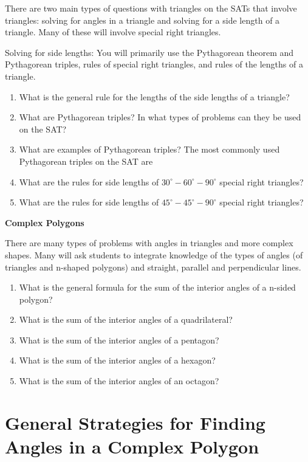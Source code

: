 \documentclass[12pt]{book}
\newcommand{\longline}{\underline{\hspace{2in}} }
\begin{document}
\hrulefill

There are two main types of questions with triangles on the SATs that involve triangles: solving for angles in a triangle and solving for a side length of a triangle. Many of these will involve special right triangles.

\bigskip
Solving for side lengths: You will primarily use the Pythagorean theorem and Pythagorean triples, rules of special right triangles, and rules of the lengths of a triangle. 

\bigskip
\begin{enumerate}[label=\arabic*)]
\item What is the general rule for the lengths of the side lengths of a triangle?
\vfill\item What are Pythagorean triples? In what types of problems can they be used on the SAT?
\vfill\item What are examples of Pythagorean triples? The most commonly used Pythagorean triples on the SAT are \longline
\vfill\item What are the rules for side lengths of $30^\circ-60^\circ-90^\circ$ special right triangles?
\vfill\item What are the rules for side lengths of $45^\circ-45^\circ-90^\circ$ special right triangles?
\end{enumerate}

\vfill
\newpage
\textbf{\large Complex Polygons}

There are many types of problems with angles in triangles and more complex shapes. Many will ask students to integrate knowledge of the types of angles (of triangles and n-shaped polygons) and straight, parallel and perpendicular lines. 

\bigskip
\begin{enumerate}[label=\arabic*)]
\item What is the general formula for the sum of the interior angles of a n-sided polygon?
\vfill\item What is the sum of the interior angles of a quadrilateral?
\vfill\item What is the sum of the interior angles of a pentagon?
\vfill\item What is the sum of the interior angles of a hexagon?
\vfill\item What is the sum of the interior angles of an octagon?
\end{enumerate}

\vfill
\section[Complex Polygons]{General Strategies for Finding Angles in a Complex Polygon}
\end{document}
